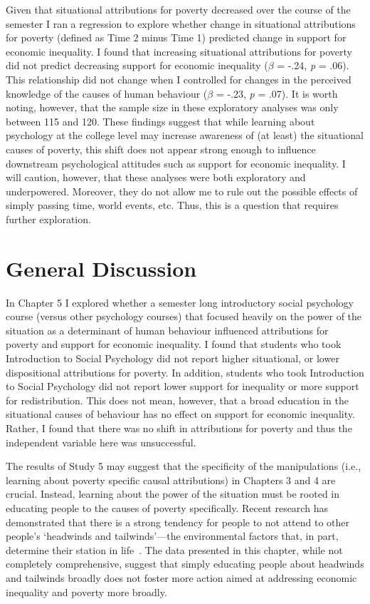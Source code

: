 \documentclass{sfuthesis}
\begin{document}
Given that situational attributions for poverty decreased over the course of the semester I ran a regression to explore whether change in situational attributions for poverty (defined as Time 2 minus Time 1) predicted change in support for economic inequality. I found that increasing situational attributions for poverty did not predict decreasing support for economic inequality ($\beta$ = -.24, \textit{p} = .06). This relationship did not change when I controlled for changes in the perceived knowledge of the causes of human behaviour ($\beta$ = -.23, \textit{p} = .07). It is worth noting, however, that the sample size in these exploratory analyses was only between 115 and 120. These findings suggest that while learning about psychology at the college level may increase awareness of (at least) the situational causes of poverty, this shift does not appear strong enough to influence downstream psychological attitudes such as support for economic inequality. I will caution, however, that these analyses were both exploratory and underpowered. Moreover, they do not allow me to rule out the possible effects of simply passing time, world events, etc. Thus, this is a question that requires further exploration.

\section{General Discussion}

In Chapter 5 I explored whether a semester long introductory social psychology course (versus other psychology courses) that focused heavily on the power of the situation as a determinant of human behaviour influenced attributions for poverty and support for economic inequality. I found that students who took Introduction to Social Psychology did not report higher situational, or lower dispositional attributions for poverty. In addition, students who took Introduction to Social Psychology did not report lower support for inequality or more support for redistribution. This does not mean, however, that a broad education in the situational causes of behaviour has no effect on support for economic inequality. Rather, I found that there was no shift in attributions for poverty and thus the independent variable here was unsuccessful.

The results of Study 5 may suggest that the specificity of the manipulations (i.e., learning about poverty specific causal attributions) in Chapters 3 and 4 are crucial. Instead, learning about the power of the situation must be rooted in educating people to the causes of poverty specifically. Recent research has demonstrated that there is a strong tendency for people to not attend to other people’s ‘headwinds and tailwinds’—the environmental factors that, in part, determine their station in life~\cite{davidai16}. The data presented in this chapter, while not completely comprehensive, suggest that simply educating people about headwinds and tailwinds broadly does not foster more action aimed at addressing economic inequality and poverty more broadly.
\end{document}
